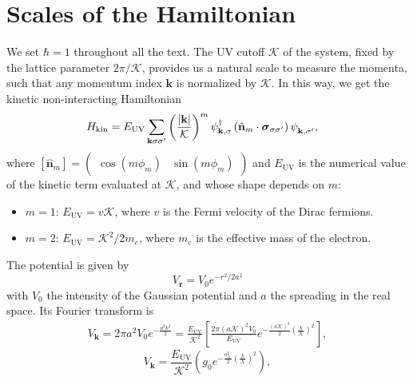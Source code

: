 \documentclass[english,aps,prd,nofootinbib,twocolumn]{revtex4-1}
\begin{document}
\section{Scales of the Hamiltonian}
We set $\hbar = 1$ throughout all the text. The UV cutoff $\mathcal{K}$ of the system, fixed by the lattice parameter $2\pi/\mathcal{K}$, provides us a natural scale to measure the momenta, such that any momentum index $\mathbf{k}$ is normalized by $\mathcal{K}$. In this way, we get the kinetic non-interacting Hamiltonian
\begin{equation}
\label{eq:Main-Ham}
\begin{split}
&H_{\mathrm{kin}} = 
E_{\mathrm{UV} }\sum_{\mathbf{k }\sigma\sigma'}
\left(\frac{|\mathbf{k}|}{\mathcal{K}}\right)^{m}
\psi_{\mathbf{k },\sigma}^{\textcolor{black}{\dagger}}
\left( \hat{\mathbf{n}}_{m} \cdot 
\boldsymbol{\sigma}_{\sigma\sigma'} \right)
\psi_{\mathbf{k },\sigma'}^{\textcolor{white}{\dagger}}
,
\end{split}
\end{equation}
where $[\hat{\mathbf{n}}_{m}]= 
\begin{pmatrix}
\cos(m\phi_{m})	&	\!\!\sin(m\phi_{m})
\end{pmatrix}$ and $E_{\mathrm{UV} }$ is the numerical value of the kinetic term evaluated at $\mathcal{K}$, and whose shape depends on $m$:
\begin{itemize}
\item $m=1$: $E_{\mathrm{UV} } = v\mathcal{K}$, where $v$ is the Fermi velocity of the Dirac fermions.
\item $m=2$: $E_{\mathrm{UV} } = \mathcal{K}^{2}/2m_{e}$, where $m_{e}$ is the effective mass of the electron. 
\end{itemize}
The potential is given by
\begin{equation}
V_{\mathbf{r}} = 
V_{0}e^{-r^{2}/2a^{2}}
\end{equation}
with $V_{0}$ the intensity of the Gaussian potential and $a$ the spreading in the real space. Its Fourier transform is
\begin{eqnarray*}
\nonumber	
V_{\mathbf{k}} = 2\pi a^{2}V_{0}
e^{-\tfrac{a^{2}k^{2}}{2}}\!
= \frac{E_{\mathrm{UV}}}{\mathcal{K}^{2}} 
\left[ \frac{2\pi (a\mathcal{K})^{2}V_{0}}{E_{\mathrm{UV}}}
e^{-\tfrac{(a{\mathcal{K}})^{2}}{2}
\left( \tfrac{k}{\mathcal{K}} \right)^{2}}
\right],	
\end{eqnarray*}
\vspace{-.5cm}
\begin{equation}
\label{eq:Fourier-Potential}
V_{\mathbf{k}} = \frac{E_{\mathrm{UV}}}{\mathcal{K}^{2}} 
\left( g_{0} 
e^{-\tfrac{a_{\mathcal{K}}^{2}}{2}
\left( \tfrac{k}{\mathcal{K}} \right)^{2}}
\right),	
\end{equation}
\end{document}
